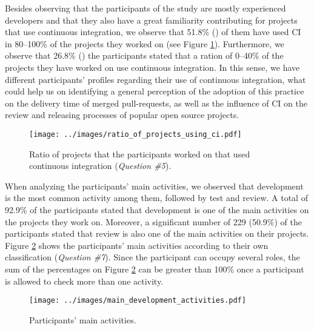 	Besides observing that the participants of the study are mostly experienced developers and that they also have a great familiarity contributing for projects that use continuous integration, we observe that 51.8\% () of them have used CI in 80--100\% of the projects they worked on (see Figure \ref{fig:ratio_of_projects_using_ci}). Furthermore, we observe that  26.8\% () the participants stated that a ration of 0--40\%  of the projects they have worked on use continuous integration. In this sense, we have different participants' profiles regarding their use of continuous integration, what could help us on identifying a general perception of the adoption of this practice on the delivery time of merged pull-requests, as well as the influence of CI on the review and releasing processes of popular open source projects.

	\begin{figure}[H]

	\texttt{[image: ../images/ratio\_of\_projects\_using\_ci.pdf]}
	\caption{Ratio of projects that the participants worked on that used continuous integration (\textit{Question \#5}).}
	\label{fig:ratio_of_projects_using_ci}       %
	\end{figure}

	When analyzing the participants' main activities, we observed that development is the most common activity among them, followed by test and review. A total of 92.9\% of the participants stated that development is one of the main activities on the projects they work on. Moreover, a significant 
	number of 229 (50.9\%) of the participants stated that review is also one of the main activities on their projects. Figure \ref{fig:main_development_activities} shows the participants' main activities according to their own classification (\textit{Question \#7}). Since the participant can occupy several roles, the sum of the percentages on Figure \ref{fig:main_development_activities} can be greater than 100\% once a participant is allowed to check more than one activity.

	\begin{figure}[H]
	\texttt{[image: ../images/main\_development\_activities.pdf]}
	\caption{Participants' main activities.}
	\label{fig:main_development_activities}       %
	\end{figure}

